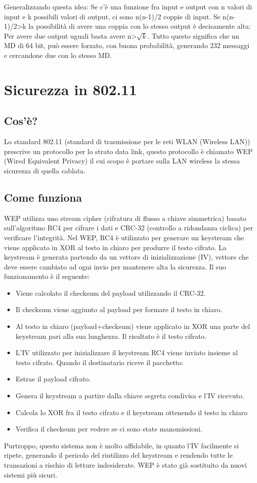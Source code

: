 Generalizzando questa idea: Se c'è una funzione fra input e output con n valori di input e k possibili valori di output, ci sono n(n-1)/2 coppie di input. Se n(n-1)/2>k la possibilità di avere una coppia con lo stesso output è decisamente alta: Per avere due output uguali basta avere n>$\sqrt{k}$.
Tutto questo significa che un MD di 64 bit, può essere forzato, con buona probabilità, generando 232 messaggi e cercandone due con lo stesso MD.

\section{Sicurezza in 802.11}
\subsection{Cos'è?}
Lo standard 802.11 (standard di trasmissione per le reti WLAN (Wireless LAN)) prescrive un protocollo per lo strato data link, questo protocollo è chiamato WEP (Wired Equivalent Privacy) il cui scopo è portare sulla LAN wireless la stessa sicurezza di quella cablata.
\subsection{Come funziona}
WEP utilizza uno stream cipher (cifratura di flusso a chiave simmetrica) basato sull'algoritmo RC4 per cifrare i dati e CRC-32 (controllo a ridondanza ciclica) per verificare l'integrità.
Nel WEP, RC4 è utilizzato per generare un keystream che viene applicato in XOR al testo in chiaro per produrre il testo cifrato. La keystream è generata partendo da un vettore di inizializzazione (IV), vettore che deve essere cambiato ad ogni invio per mantenere alta la sicurezza.
Il suo funzionamento è il seguente:
\begin{itemize}
\item	Viene calcolato il checksum del payload utilizzando il CRC-32.
\item	Il checksum viene aggiunto al payload per formare il testo in chiaro.
\item	Al testo in chiaro (payload+checksum) viene applicato in XOR una parte del keystream pari alla sua lunghezza. Il risultato è il testo cifrato.
\item	L'IV utilizzato per inizializzare il keystream RC4 viene inviato insieme al testo cifrato.
Quando il destinatario riceve il pacchetto:
\item	Estrae il payload cifrato.
\item	Genera il keystream a partire dalla chiave segreta condivisa e l'IV ricevuto.
\item	Calcola lo XOR fra il testo cifrato e il keystream ottenendo il testo in chiaro
\item	Verifica il checksum per vedere se ci sono state manomissioni.
\end{itemize}
Purtroppo, questo sistema non è molto affidabile, in quanto l'IV facilmente si ripete, generando il pericolo del riutilizzo del keystream e rendendo tutte le transazioni a rischio di letture indesiderate. WEP è stato già sostituito da nuovi sistemi più sicuri.

